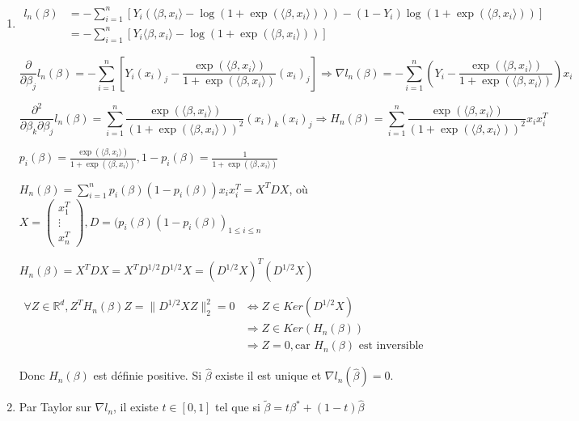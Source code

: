 \documentclass[10pt,a4paper,oneside]{article}
\begin{document}
\begin{enumerate}
\item

\begin{align*}
l_n(\beta) &= -\sum_{i = 1}^n [Y_i (\langle \beta, x_i \rangle - \log(1 + \exp(\langle \beta, x_i \rangle))) - (1 - Y_i) \log(1 + \exp(\langle \beta, x_i \rangle))] \\
&= -\sum_{i = 1}^n [Y_i \langle \beta, x_i \rangle - \log (1 + \exp(\langle \beta, x_i \rangle))]
\end{align*}

\[ \frac{\partial}{\partial \beta_j} l_n(\beta) = - \sum_{i = 1}^n [Y_i (x_i)_j - \frac{\exp(\langle \beta, x_i \rangle)}{1 + \exp(\langle \beta, x_i \rangle)} (x_i)_j] \Rightarrow \nabla l_n(\beta) = -\sum_{i = 1}^n (Y_i - \frac{\exp(\langle \beta, x_i \rangle)}{1 + \exp(\langle \beta, x_i \rangle)}) x_i \]

\[ \frac{\partial^2}{\partial \beta_k \partial \beta_j} l_n(\beta) = \sum_{i = 1}^n \frac{\exp(\langle \beta, x_i \rangle)}{(1 + \exp(\langle \beta, x_i \rangle))^2} (x_i)_k (x_i)_j \Rightarrow H_n(\beta) = \sum_{i = 1}^n \frac{\exp(\langle \beta, x_i \rangle)}{(1 + \exp(\langle \beta, x_i \rangle))^2} x_i x_i^T \]

$p_i(\beta) = \frac{\exp(\langle \beta, x_i \rangle)}{1 + \exp(\langle \beta, x_i \rangle)}, 1 - p_i(\beta) = \frac{1}{1 + \exp(\langle \beta, x_i \rangle)}$

$H_n(\beta) = \sum_{i = 1}^n p_i(\beta) (1 - p_i(\beta)) x_i x_i^T = X^T D X$, où $X = \left( \begin{array}{c} x_1^T \\ \vdots \\ x_n^T \end{array} \right) , D =  (p_i(\beta) (1 - p_i(\beta))_{1 \leq i \leq n}$

$H_n(\beta) = X^T D X = X^T D^{1/2} D^{1/2} X = (D^{1/2}X)^T (D^{1/2}X)$

\begin{align*}
\forall Z \in \mathbb{R}^d, Z^T H_n(\beta)Z = \| D^{1/2}XZ \|^2_2 = 0 &\Leftrightarrow Z \in Ker(D^{1/2}X) \\
&\Rightarrow Z \in Ker(H_n(\beta)) \\
&\Rightarrow Z = 0, \text{car } H_n(\beta) \text{ est inversible}
\end{align*}

Donc $H_n(\beta)$ est définie positive. Si $\hat{\beta}$ existe il est unique et $\nabla l_n(\hat{\beta}) = 0$.
\item
Par Taylor sur $\nabla l_n$, il existe $t \in [0,1]$ tel que si $\tilde{\beta} = t\beta^* + (1 - t)\hat{\beta}$


\end{enumerate}
\end{document}
